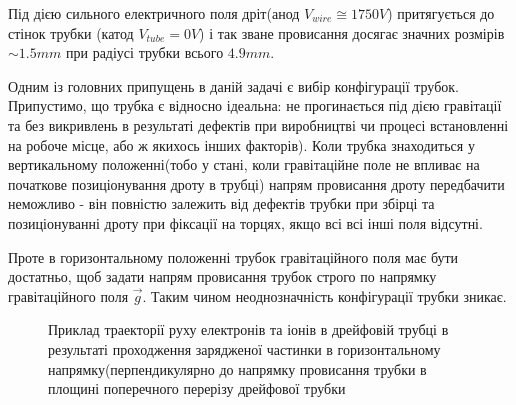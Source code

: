 \documentclass[]{article}
\begin{document}
	Під дією сильного електричного поля дріт(анод $V_{wire}\cong1750 V$) притягується до стінок трубки (катод $V_{tube}=0V$) і так зване провисання досягає значних розмірів $\sim1.5mm$ при радіусі трубки всього $4.9 mm$. 

	Одним із головних припущень в даній задачі є вибір конфігурації трубок. Припустимо, що трубка є відносно ідеальна: не прогинається під дією гравітації та без викривлень в результаті дефектів при виробництві чи процесі встановленні на робоче місце, або ж якихось інших факторів). Коли трубка знаходиться у вертикальному положенні(тобо у стані, коли гравітаційне поле не впливає на початкове позиціонування дроту в трубці) напрям провисання дроту передбачити неможливо - він повністю залежить від дефектів трубки при збірці та позиціонуванні дроту при фіксації на торцях, якщо всі всі інші поля відсутні.
	
	Проте в горизонтальному положенні трубок гравітаційного поля має бути достатньо, щоб задати напрям провисання трубок строго по напрямку гравітаційного поля $\vec{g}$. Таким чином неоднозначність конфігурації трубки зникає.
	\begin{figure}[h]
		\centering
		\qquad
		\caption{ Приклад траекторії руху електронів та іонів в дрейфовій трубці в результаті проходження зарядженої частинки в горизонтальному напрямку(перпендикулярно до напрямку провисання трубки в площині поперечного перерізу дрейфової трубки}			
	\end{figure}
	
\end{document}
